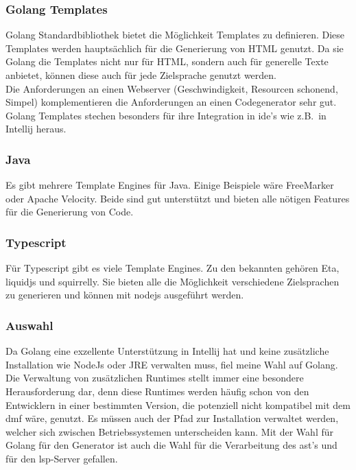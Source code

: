 \documentclass[./einleitung.tex]{subfiles}
\begin{document}
\subsubsection{Golang Templates}
Golang Standardbibliothek bietet die Möglichkeit Templates zu definieren.
Diese Templates werden hauptsächlich für die Generierung von HTML genutzt.
Da sie Golang die Templates nicht nur für HTML, sondern auch für generelle Texte anbietet, können diese auch für jede Zielsprache genutzt werden. \\
Die Anforderungen an einen Webserver (Geschwindigkeit, Resourcen schonend, Simpel) komplementieren die Anforderungen an einen Codegenerator sehr gut. \\
Golang Templates stechen besonders für ihre Integration in \acrshort{ide}'s wie z.B.\ in Intellij heraus.

\subsubsection{Java}
Es gibt mehrere Template Engines für Java.
Einige Beispiele wäre FreeMarker oder Apache Velocity.
Beide sind gut unterstützt und bieten alle nötigen Features für die Generierung von Code.

\subsubsection{Typescript}
Für Typescript gibt es viele Template Engines.
Zu den bekannten gehören Eta, liquidjs und squirrelly.
Sie bieten alle die Möglichkeit verschiedene Zielsprachen zu generieren und können mit nodejs ausgeführt werden.

\subsubsection{Auswahl}
Da Golang eine exzellente Unterstützung in Intellij hat und keine zusätzliche Installation wie NodeJs oder JRE verwalten muss, fiel meine Wahl auf Golang.
Die Verwaltung von zusätzlichen Runtimes stellt immer eine besondere Herausforderung dar, denn diese Runtimes werden häufig schon von den Entwicklern in einer bestimmten Version, die potenziell nicht kompatibel mit dem \acrshort{dmf} wäre, genutzt.
Es müssen auch der Pfad zur Installation verwaltet werden, welcher sich zwischen Betriebssystemen unterscheiden kann.
\newline
Mit der Wahl für Golang für den Generator ist auch die Wahl für die Verarbeitung des \acrshort{ast}'s und für den \acrlong{lsp}-Server gefallen.
\end{document}
